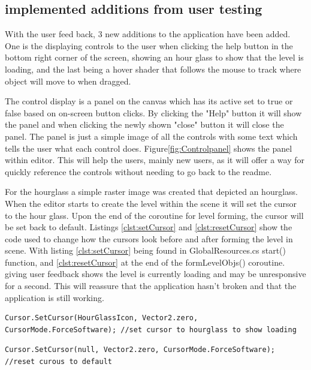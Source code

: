 \subsection{implemented additions from user testing}
With the user feed back, 3 new additions to the application have been added. One is the displaying controls to the user when clicking the help button in the bottom right corner of the screen, showing an hour glass to show that the level is loading, and the last being a hover shader that follows the mouse to track where object will move to when dragged.

The control display is a panel on the canvas which has its active set to true or false based on on-screen button clicks. By clicking the "Help" button it will show the panel and when clicking the newly shown "close" button it will close the panel. The panel is just a simple image of all the controls with some text which tells the user what each control does.
Figure\ref{fig:Controlpanel} shows the panel within editor. This will help the users, mainly new users, as it will offer a way for quickly reference the controls without needing to go back to the readme.

For the hourglass a simple raster image was created that depicted an hourglass. When the editor starts to create the level within the scene it will set the cursor to the hour glass. Upon the end of the coroutine for level forming, the cursor will be set back to default. Listings \ref{clst:setCursor} and \ref{clst:resetCursor} show the code used to change how the cursors look before and after forming the level in scene. With listing \ref{clst:setCursor} being found in GlobalResources.cs start() function, and \ref{clst:resetCursor} at the end of the formLevelObjs() coroutine. giving user feedback shows the level is currently loading and may be unresponsive for a second. This will reassure that the application hasn't broken and that the application is still working.
\begin{minipage}{\textwidth}
\begin{lstlisting}[language={[Sharp]C}, caption=code to set cursor, label=clst:setCursor]
Cursor.SetCursor(HourGlassIcon, Vector2.zero, CursorMode.ForceSoftware); //set cursor to hourglass to show loading
\end{lstlisting}

\begin{lstlisting}[language={[Sharp]C}, caption=code to reset cursor', label=clst:resetCursor]
        Cursor.SetCursor(null, Vector2.zero, CursorMode.ForceSoftware); //reset curous to default
\end{lstlisting}
\end{minipage}

